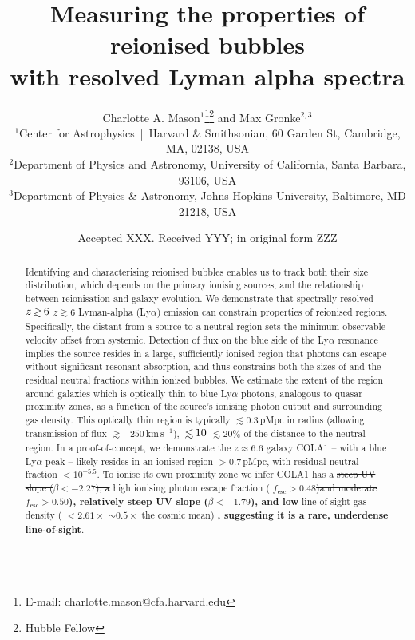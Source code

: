 \documentclass[fleqn,usenatbib]{mnras}
\title[Properties of reionised bubbles]{Measuring the properties of reionised bubbles\\with resolved Lyman alpha spectra}
\author[Mason and Gronke]{Charlotte A. Mason$^{1}$\thanks{E-mail: charlotte.mason@cfa.harvard.edu}\thanks{Hubble Fellow}
and Max Gronke$^{2,3}$\href{Hfootnote.2}{\samethanks}
\\
$^{1}$Center for Astrophysics \,|\, Harvard \& Smithsonian, 60 Garden St, Cambridge, MA, 02138, USA\\
$^{2}$Department of Physics and Astronomy, University of California, Santa Barbara, 93106, USA\\
$^{3}$Department of Physics \& Astronomy, Johns Hopkins University, Baltimore, MD 21218, USA
}
\date{Accepted XXX. Received YYY; in original form ZZZ}
\providecommand{\DIFadd}[1]{{\protect\color{Green} {\bf #1}}} %
\providecommand{\DIFdel}[1]{{\protect\color{Gray} \scriptsize \sout{#1}}} %
\providecommand{\DIFaddbegin}{} %
\providecommand{\DIFaddend}{} %
\providecommand{\DIFdelbegin}{} %
\providecommand{\DIFdelend}{} %
\newcommand{\DIFscaledelfig}{0.5}
\newlength{\DIFdelgraphicswidth} %
\newlength{\DIFdelgraphicsheight} %
\newcommand{\DIFaddincludegraphics}[2][]{{\color{purple}\fbox{\DIFOincludegraphics[#1]{#2}}}} %
\newcommand{\DIFdelincludegraphics}[2][]{%
\sbox{\DIFdelgraphicsbox}{\DIFOincludegraphics[#1]{#2}}%
\settoboxwidth{\DIFdelgraphicswidth}{\DIFdelgraphicsbox} %
\settoboxtotalheight{\DIFdelgraphicsheight}{\DIFdelgraphicsbox} %
\scalebox{\DIFscaledelfig}{%
\parbox[b]{\DIFdelgraphicswidth}{\usebox{\DIFdelgraphicsbox}\\[-\baselineskip] \rule{\DIFdelgraphicswidth}{0em}}\llap{\resizebox{\DIFdelgraphicswidth}{\DIFdelgraphicsheight}{%
\setlength{\unitlength}{\DIFdelgraphicswidth}%
\begin{picture}(1,1)%
\thicklines\linethickness{2pt} %
{\color[rgb]{1,0,0}\put(0,0){\framebox(1,1){}}}%
{\color[rgb]{1,0,0}\put(0,0){\line( 1,1){1}}}%
{\color[rgb]{1,0,0}\put(0,1){\line(1,-1){1}}}%
\end{picture}%
}\hspace*{3pt}}} %
} %
\DeclareRobustCommand{\DIFaddbegin}{\DIFOaddbegin \let\includegraphics\DIFaddincludegraphics} %
\DeclareRobustCommand{\DIFaddend}{\DIFOaddend \let\includegraphics\DIFOincludegraphics} %
\DeclareRobustCommand{\DIFdelbegin}{\DIFOdelbegin \let\includegraphics\DIFdelincludegraphics} %
\DeclareRobustCommand{\DIFdelend}{\DIFOaddend \let\includegraphics\DIFOincludegraphics} %
\begin{document}
\label{firstpage}
\pagerange{\pageref{firstpage}--\pageref{lastpage}}
\maketitle

\begin{abstract}
%
Identifying and characterising reionised bubbles enables us to track both their size distribution, which depends on the primary ionising sources, and the relationship between reionisation and galaxy evolution.
%
We demonstrate that spectrally resolved \DIFdelbegin \DIFdel{$z\simgt6$ }\DIFdelend \DIFaddbegin \DIFadd{$z\gtrsim6$ }\DIFaddend Lyman-alpha (Ly$\alpha$) emission can constrain properties of reionised regions.
%
Specifically, the distant from a source to a neutral region sets the minimum observable \lya velocity offset from systemic. Detection of flux on the blue side of the Ly$\alpha$ resonance implies the source resides in a large, sufficiently ionised region that photons can escape without significant resonant absorption, and thus constrains both the sizes of and the residual neutral fractions within ionised bubbles. 
%
We estimate the extent of the region around galaxies which is optically thin to blue Ly$\alpha$ photons, analogous to quasar proximity zones, as a function of the source's ionising photon output and surrounding gas density.
This optically thin region is typically $\lesssim 0.3$\,pMpc in radius (allowing transmission of flux $\gtrsim -250$\,km\,s$^{-1}$), \DIFdelbegin \DIFdel{$\simlt 10$}\DIFdelend \DIFaddbegin \DIFadd{$\lesssim 20$}\DIFaddend \% of the distance to the neutral region.
%
In a proof-of-concept, we demonstrate the $z\approx6.6$ galaxy COLA1 -- with a blue Ly$\alpha$ peak -- likely resides in an ionised region $>0.7$\,pMpc, with residual neutral fraction $<10^{-5.5}$. To ionise its own proximity zone we infer COLA1 has a \DIFdelbegin \DIFdel{steep UV slope ($\beta < -2.27$), a }\DIFdelend high ionising photon escape fraction (\DIFdelbegin \DIFdel{$f_{\mathrm{esc}}>0.48$)and moderate }\DIFdelend \DIFaddbegin \DIFadd{$f_{\mathrm{esc}}>0.50$), relatively steep UV slope ($\beta < -1.79$), and low }\DIFaddend line-of-sight gas density (\DIFdelbegin \DIFdel{$<2.61\times$ }\DIFdelend \DIFaddbegin \DIFadd{$\sim0.5\times$ }\DIFaddend the cosmic mean)\DIFaddbegin \DIFadd{, suggesting it is a rare, underdense line-of-sight}\DIFaddend .
%
\end{abstract}
\end{document}
